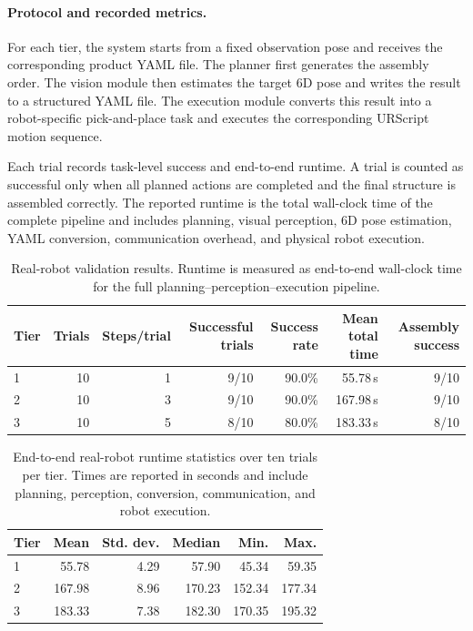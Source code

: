 \paragraph{Protocol and recorded metrics.}
For each tier, the system starts from a fixed observation pose and receives the corresponding
product YAML file. The planner first generates the assembly order. The vision module then
estimates the target 6D pose and writes the result to a structured YAML file. The execution
module converts this result into a robot-specific pick-and-place task and executes the
corresponding URScript motion sequence.

Each trial records task-level success and end-to-end runtime. A trial is counted as successful
only when all planned actions are completed and the final structure is assembled correctly.
The reported runtime is the total wall-clock time of the complete pipeline and includes
planning, visual perception, 6D pose estimation, YAML conversion, communication overhead,
and physical robot execution.

\begin{table}[t]
    \centering
    \caption{Real-robot validation results. Runtime is measured as end-to-end wall-clock time
    for the full planning--perception--execution pipeline.}
    \label{tab:real_robot_results}
    \begin{tabular}{lrrrrrr}
        \toprule
        Tier & Trials & Steps/trial & Successful trials & Success rate & Mean total time & Assembly success \\
        \midrule
        1 & 10 & 1 & 9/10 & 90.0\% & 55.78\,s & 9/10 \\
        2 & 10 & 3 & 9/10 & 90.0\% & 167.98\,s & 9/10 \\
        3 & 10 & 5 & 8/10 & 80.0\% & 183.33\,s & 8/10 \\
        \bottomrule
    \end{tabular}
\end{table}

\begin{table}[t]
    \centering
    \caption{End-to-end real-robot runtime statistics over ten trials per tier. Times are
    reported in seconds and include planning, perception, conversion, communication, and
    robot execution.}
    \label{tab:real_robot_timing}
    \begin{tabular}{lrrrrr}
        \toprule
        Tier & Mean & Std. dev. & Median & Min. & Max. \\
        \midrule
        1 & 55.78 & 4.29 & 57.90 & 45.34 & 59.35 \\
        2 & 167.98 & 8.96 & 170.23 & 152.34 & 177.34 \\
        3 & 183.33 & 7.38 & 182.30 & 170.35 & 195.32 \\
        \bottomrule
    \end{tabular}
\end{table}


